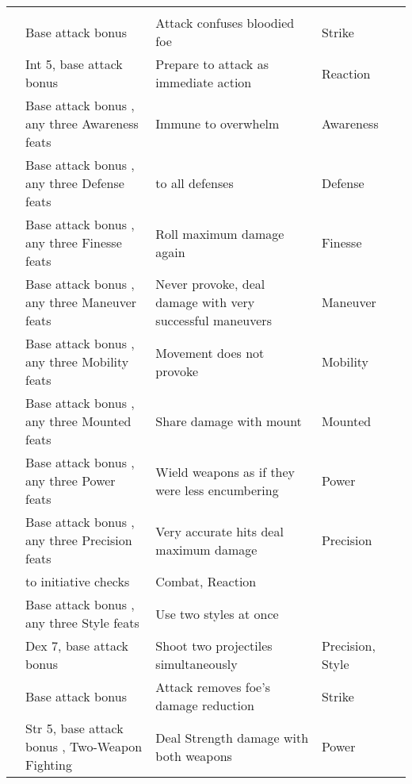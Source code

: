 {\begin{longtabu}{>{\lcol}p{10em} >{\lcol}p{15em} >{\lcol}X >{\lcol}p{6em} >{\lcol}p{3em}}
        \midrule
         &  &  &  &  \\
         & Base attack bonus  & Attack confuses bloodied foe & Strike &  \\
         & Int 5, base attack bonus  & Prepare to attack as immediate action & Reaction &  \\
         & Base attack bonus , any three Awareness feats & Immune to overwhelm & Awareness &  \\
         & Base attack bonus , any three Defense feats &  to all defenses & Defense &  \\
         & Base attack bonus , any three Finesse feats & Roll maximum damage again & Finesse &  \\
         & Base attack bonus , any three Maneuver feats & Never provoke, deal damage with very successful maneuvers & Maneuver &  \\
         & Base attack bonus , any three Mobility feats & Movement does not provoke & Mobility&  \\
         & Base attack bonus , any three Mounted feats & Share damage with mount & Mounted&  \\
         & Base attack bonus , any three Power feats & Wield weapons as if they were less encumbering & Power&  \\
         & Base attack bonus , any three Precision feats & Very accurate hits deal maximum damage & Precision &  \\
         &  to initiative checks & Combat, Reaction &  \\
         & Base attack bonus , any three Style feats & Use two styles at once & \x &  \\
         & Dex 7, base attack bonus  & Shoot two projectiles simultaneously & Precision, Style &  \\
         & Base attack bonus  & Attack removes foe's damage reduction & Strike &  \\
         & Str 5, base attack bonus , Two-Weapon Fighting & Deal Strength damage with both weapons & Power &  \\


\end{longtabu}}
